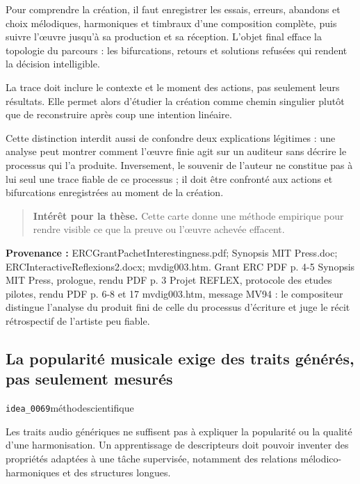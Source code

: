 \documentclass[10pt,a4paper]{article}
\begin{document}
Pour comprendre la création, il faut enregistrer les essais, erreurs, abandons et choix mélodiques, harmoniques et timbraux d'une composition complète, puis suivre l'œuvre jusqu'à sa production et sa réception. L'objet final efface la topologie du parcours : les bifurcations, retours et solutions refusées qui rendent la décision intelligible.

La trace doit inclure le contexte et le moment des actions, pas seulement leurs résultats. Elle permet alors d'étudier la création comme chemin singulier plutôt que de reconstruire après coup une intention linéaire.

Cette distinction interdit aussi de confondre deux explications légitimes : une analyse peut montrer comment l'œuvre finie agit sur un auditeur sans décrire le processus qui l'a produite. Inversement, le souvenir de l'auteur ne constitue pas à lui seul une trace fiable de ce processus ; il doit être confronté aux actions et bifurcations enregistrées au moment de la création.

\begin{quote}
\textbf{Intérêt pour la thèse.} Cette carte donne une méthode empirique pour rendre visible ce que la preuve ou l'œuvre achevée effacent.
\end{quote}
{\footnotesize\color{metadata}\textbf{Provenance :} ERCGrantPachetInterestingness.pdf; Synopsis MIT Press.doc; ERCInteractiveReflexions2.docx; mvdig003.htm. Grant ERC PDF p. 4-5 Synopsis MIT Press, prologue, rendu PDF p. 3 Projet REFLEX, protocole des etudes pilotes, rendu PDF p. 6-8 et 17 mvdig003.htm, message MV94 : le compositeur distingue l'analyse du produit fini de celle du processus d'écriture et juge le récit rétrospectif de l'artiste peu fiable.\par}

\subsection{La popularité musicale exige des traits générés, pas seulement mesurés}
{\small\color{metadata} \texttt{idea\_0069}\quad\textbullet\quad méthode\quad\textbullet\quad scientifique\par}

Les traits audio génériques ne suffisent pas à expliquer la popularité ou la qualité d'une harmonisation. Un apprentissage de descripteurs doit pouvoir inventer des propriétés adaptées à une tâche supervisée, notamment des relations mélodico-harmoniques et des structures longues.
\end{document}
